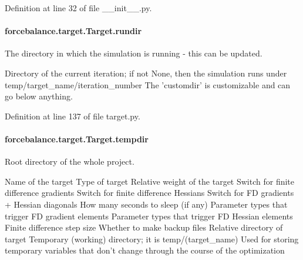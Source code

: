 Definition at line 32 of file \-\_\-\-\_\-init\-\_\-\-\_\-.\-py.

\hypertarget{classforcebalance_1_1target_1_1Target_a6872de5b2d4273b82336ea5b0da29c9e}{
\paragraph[{rundir}]{\setlength{\rightskip}{0pt plus 5cm}forcebalance.\-target.\-Target.\-rundir\hspace{0.3cm}{\ttfamily [inherited]}}}\label{classforcebalance_1_1target_1_1Target_a6872de5b2d4273b82336ea5b0da29c9e}


The directory in which the simulation is running -\/ this can be updated. 

Directory of the current iteration; if not None, then the simulation runs under temp/target\-\_\-name/iteration\-\_\-number The 'customdir' is customizable and can go below anything.

Definition at line 137 of file target.\-py.

\hypertarget{classforcebalance_1_1target_1_1Target_aa1f01b5b78db253b5b66384ed11ed193}{
\paragraph[{tempdir}]{\setlength{\rightskip}{0pt plus 5cm}forcebalance.\-target.\-Target.\-tempdir\hspace{0.3cm}{\ttfamily [inherited]}}}\label{classforcebalance_1_1target_1_1Target_aa1f01b5b78db253b5b66384ed11ed193}


Root directory of the whole project. 

Name of the target Type of target Relative weight of the target Switch for finite difference gradients Switch for finite difference Hessians Switch for F\-D gradients + Hessian diagonals How many seconds to sleep (if any) Parameter types that trigger F\-D gradient elements Parameter types that trigger F\-D Hessian elements Finite difference step size Whether to make backup files Relative directory of target Temporary (working) directory; it is temp/(target\-\_\-name) Used for storing temporary variables that don't change through the course of the optimization 

